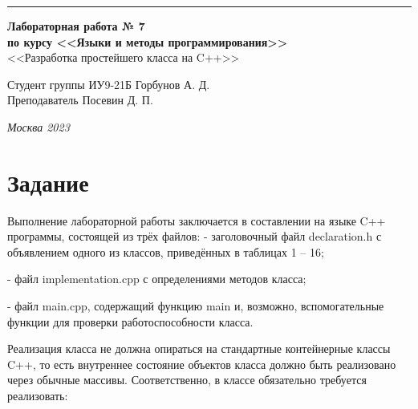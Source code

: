 \documentclass[a4paper, 14pt]{extarticle}
\begin{document}
\begin{titlepage}
\vspace*{-16pt}
\hspace{30pt}\rule{0.866\textwidth}{0.4pt}
  
\vspace{11em}

\begin{center}
\Large {\bf Лабораторная работа № 7} \\ 
\large {\bf по курсу <<Языки и методы программирования>>} \\
\large <<Разработка простейшего класса на C++>> 
\end{center}\normalsize

\vspace{8em}


\begin{flushright}
  {Студент группы ИУ9-21Б Горбунов А. Д. \hspace*{15pt}\\ 
  \vspace{2ex}
  Преподаватель Посевин Д. П.\hspace*{15pt}}
\end{flushright}

\bigskip

\vfill
 

\begin{center}
\textsl{Москва 2023}
\end{center}
\end{titlepage}

\renewcommand{\ttdefault}{pcr}

\setlength{\tabcolsep}{3pt}
\newpage
\setcounter{page}{2}

\section{Задание}\label{Sect::task}
	Выполнение лабораторной работы заключается в составлении на языке C++
программы, состоящей из трёх файлов:
- заголовочный файл declaration.h с объявлением одного из классов, приведённых в таблицах 1 – 16;

- файл implementation.cpp с определениями методов класса;

- файл main.cpp, содержащий функцию main и, возможно, вспомогательные функции для проверки работоспособности класса.

Реализация класса не должна опираться на стандартные контейнерные классы
C++, то есть внутреннее состояние объектов класса должно быть реализовано через обычные массивы. Соответственно, в классе обязательно требуется реализовать:
\end{document}
